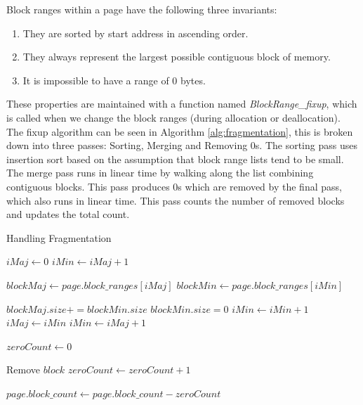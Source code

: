\documentclass[../diss.tex]{subfiles}
\begin{document}
Block ranges within a page have the following three invariants:
\begin{enumerate}
    \item They are sorted by start address in ascending order.
    \item They always represent the largest possible contiguous block of memory.
    \item It is impossible to have a range of 0 bytes.
\end{enumerate}

These properties are maintained with a function named \emph{BlockRange\_fixup}, which is called when we change the block ranges (during allocation or deallocation). The fixup algorithm can be seen in Algorithm \ref{alg:fragmentation}, this is broken down into three passes: Sorting, Merging and Removing 0s. The sorting pass uses insertion sort based on the assumption that block range lists tend to be small. The merge pass runs in linear time by walking along the list combining contiguous blocks. This pass produces 0s which are removed by the final pass, which also runs in linear time. This pass counts the number of removed blocks and updates the total count.

\begin{algorithm}
\caption{Handling Fragmentation}
\label{alg:fragmentation}
\begin{algorithmic}


\State {}

\State

\State $iMaj\gets 0$
\State $iMin\gets iMaj + 1$


    \State $blockMaj\gets page.block\_ranges[iMaj]$ 
    \State $blockMin\gets page.block\_ranges[iMin]$ 
    
    \State
    
        \State $blockMaj.size += blockMin.size$
        \State $blockMin.size = 0$
        \State $iMin\gets iMin + 1$
    \Else
        \State $iMaj\gets iMin$
        \State $iMin\gets iMaj + 1$
    \EndIf

\EndWhile

\State

\State $zeroCount\gets 0$

        \State Remove $block$
        \State $zeroCount\gets zeroCount + 1$
    \EndIf
\EndFor

\State $page.block\_count\gets page.block\_count - zeroCount$

\EndFunction

\end{algorithmic}
\end{algorithm}
\end{document}
